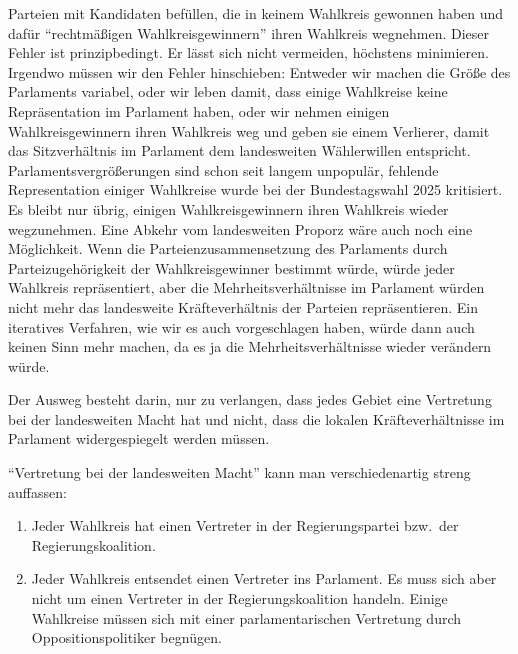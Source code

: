 Parteien mit Kandidaten befüllen, die in keinem Wahlkreis gewonnen haben und dafür
\enquote{rechtmäßigen Wahlkreisgewinnern} ihren Wahlkreis wegnehmen. Dieser Fehler ist
prinzipbedingt. Er lässt sich nicht vermeiden, höchstens minimieren. Irgendwo müssen wir den
Fehler hinschieben: Entweder wir machen die Größe des Parlaments variabel, oder wir leben damit,
dass einige Wahlkreise keine Repräsentation im Parlament haben, oder wir nehmen einigen
Wahlkreisgewinnern ihren Wahlkreis weg und geben sie einem Verlierer, damit das Sitzverhältnis im
Parlament dem landesweiten Wählerwillen entspricht. Parlamentsvergrößerungen sind schon seit
langem unpopulär, fehlende Representation einiger Wahlkreise wurde bei der Bundestagswahl 2025
kritisiert. Es bleibt nur übrig, einigen Wahlkreisgewinnern ihren Wahlkreis wieder wegzunehmen.
Eine Abkehr vom landesweiten Proporz wäre auch noch eine Möglichkeit. Wenn die
Parteienzusammensetzung des Parlaments durch Parteizugehörigkeit der Wahlkreisgewinner bestimmt
würde, würde jeder Wahlkreis repräsentiert, aber die Mehrheitsverhältnisse im Parlament würden
nicht mehr das landesweite Kräfteverhältnis der Parteien repräsentieren. Ein iteratives
Verfahren, wie wir es auch vorgeschlagen haben, würde dann auch keinen Sinn mehr machen, da es
ja die Mehrheitsverhältnisse wieder verändern würde.

Der Ausweg besteht darin, nur zu verlangen, dass jedes Gebiet eine Vertretung bei der
landesweiten Macht hat und nicht, dass die lokalen Kräfteverhältnisse im Parlament
widergespiegelt werden müssen.

\enquote{Vertretung bei der landesweiten Macht} kann man verschiedenartig streng auffassen:
\begin{enumerate}[label=\alph*)]
  \item Jeder Wahlkreis hat einen Vertreter in der Regierungspartei bzw.\ der
    Regierungskoalition.
  \item Jeder Wahlkreis entsendet einen Vertreter ins Parlament. Es muss sich aber nicht um einen
    Vertreter in der Regierungskoalition handeln. Einige Wahlkreise müssen sich mit einer
    parlamentarischen Vertretung durch Oppositionspolitiker begnügen.
\end{enumerate}


